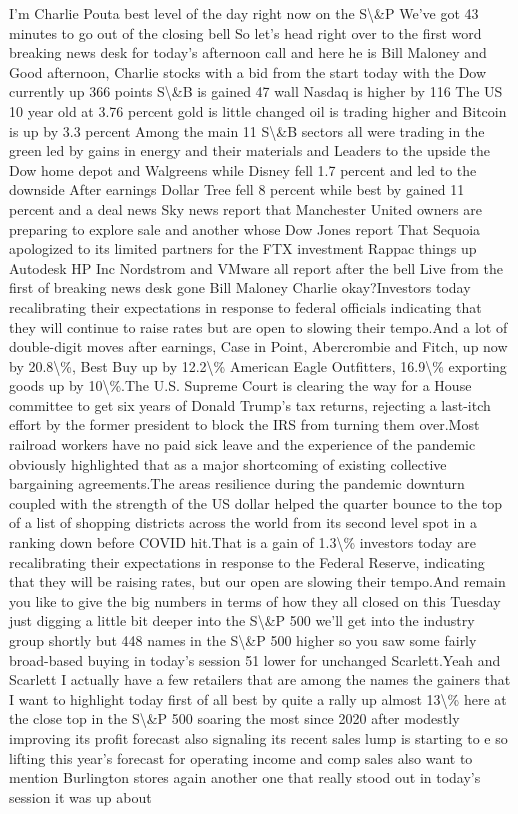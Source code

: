 \documentclass{article}%
\begin{document}
I'm Charlie Pouta best level of the day right now on the S\textbackslash{}\&P We've got 43 minutes to go out of the closing bell So let's head right over to the first word breaking news desk for today's afternoon call and here he is Bill Maloney and Good afternoon, Charlie stocks with a bid from the start today with the Dow currently up 366 points S\textbackslash{}\&B is gained 47 wall Nasdaq is higher by 116 The US 10 year old at 3.76 percent gold is little changed oil is trading higher and Bitcoin is up by 3.3 percent Among the main 11 S\textbackslash{}\&B sectors all were trading in the green led by gains in energy and their materials and Leaders to the upside the Dow home depot and Walgreens while Disney fell 1.7 percent and led to the downside After earnings Dollar Tree fell 8 percent while best by gained 11 percent and a deal news Sky news report that Manchester United owners are preparing to explore sale and another whose Dow Jones report That Sequoia apologized to its limited partners for the FTX investment Rappac things up Autodesk HP Inc Nordstrom and VMware all report after the bell Live from the first of breaking news desk gone Bill Maloney Charlie okay?Investors today recalibrating their expectations in response to federal officials indicating that they will continue to raise rates but are open to slowing their tempo.And a lot of double{-}digit moves after earnings, Case in Point, Abercrombie and Fitch, up now by 20.8\textbackslash{}\%, Best Buy up by 12.2\textbackslash{}\% American Eagle Outfitters, 16.9\textbackslash{}\% exporting goods up by 10\textbackslash{}\%.The U.S. Supreme Court is clearing the way for a House committee to get six years of Donald Trump's tax returns, rejecting a last{-}itch effort by the former president to block the IRS from turning them over.Most railroad workers have no paid sick leave and the experience of the pandemic obviously highlighted that as a major shortcoming of existing collective bargaining agreements.The areas resilience during the pandemic downturn coupled with the strength of the US dollar helped the quarter bounce to the top of a list of shopping districts across the world from its second level spot in a ranking down before COVID hit.That is a gain of 1.3\textbackslash{}\% investors today are recalibrating their expectations in response to the Federal Reserve, indicating that they will be raising rates, but our open are slowing their tempo.And remain you like to give the big numbers in terms of how they all closed on this Tuesday just digging a little bit deeper into the S\textbackslash{}\&P 500 we'll get into the industry group shortly but 448 names in the S\textbackslash{}\&P 500 higher so you saw some fairly broad{-}based buying in today's session 51 lower for unchanged Scarlett.Yeah and Scarlett I actually have a few retailers that are among the names the gainers that I want to highlight today first of all best by quite a rally up almost 13\textbackslash{}\% here at the close top in the S\textbackslash{}\&P 500 soaring the most since 2020 after modestly improving its profit forecast also signaling its recent sales lump is starting to e so lifting this year's forecast for operating income and comp sales also want to mention Burlington stores again another one that really stood out in today's session it was up about 
\end{document}
